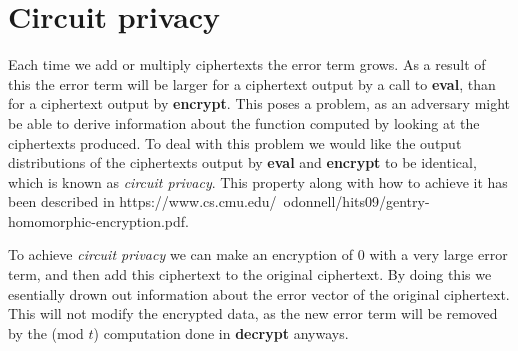 \documentclass[../main.tex]{subfiles}
\begin{document}
\section{Circuit privacy}
Each time we add or multiply ciphertexts the error term grows.
As a result of this the error term will be larger for a ciphertext output by a call to \textbf{eval}, than for a ciphertext output by \textbf{encrypt}.
This poses a problem, as an adversary might be able to derive information about the function computed by looking at the ciphertexts produced.
To deal with this problem we would like the output distributions of the ciphertexts output by \textbf{eval} and \textbf{encrypt} to be identical, which is known as \textit{circuit privacy}.
This property along with how to achieve it has been described in https://www.cs.cmu.edu/~odonnell/hits09/gentry-homomorphic-encryption.pdf. %

To achieve \textit{circuit privacy} we can make an encryption of $0$ with a very large error term, and then add this ciphertext to the original ciphertext.
By doing this we esentially drown out information about the error vector of the original ciphertext.
This will not modify the encrypted data, as the new error term will be removed by the (mod $t$) computation done in \textbf{decrypt} anyways.
\end{document}
